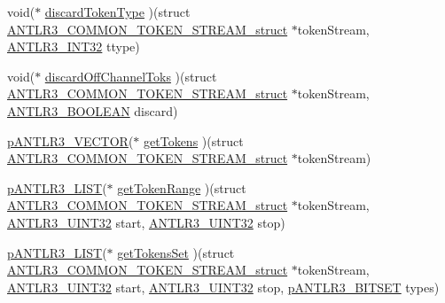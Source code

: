 \begin{DoxyCompactItemize}
\item 
void($\ast$ \hyperlink{struct_a_n_t_l_r3___c_o_m_m_o_n___t_o_k_e_n___s_t_r_e_a_m__struct_a9342253f1da5c79b615324f77c523d70}{discard\-Token\-Type} )(struct \hyperlink{struct_a_n_t_l_r3___c_o_m_m_o_n___t_o_k_e_n___s_t_r_e_a_m__struct}{A\-N\-T\-L\-R3\-\_\-\-C\-O\-M\-M\-O\-N\-\_\-\-T\-O\-K\-E\-N\-\_\-\-S\-T\-R\-E\-A\-M\-\_\-struct} $\ast$token\-Stream, \hyperlink{antlr3defs_8h_a6faef5c4687f8eb633d2aefea93973ca}{A\-N\-T\-L\-R3\-\_\-\-I\-N\-T32} ttype)
\item 
void($\ast$ \hyperlink{struct_a_n_t_l_r3___c_o_m_m_o_n___t_o_k_e_n___s_t_r_e_a_m__struct_aa851d1b2d1d1e28c84e988ac92972a30}{discard\-Off\-Channel\-Toks} )(struct \hyperlink{struct_a_n_t_l_r3___c_o_m_m_o_n___t_o_k_e_n___s_t_r_e_a_m__struct}{A\-N\-T\-L\-R3\-\_\-\-C\-O\-M\-M\-O\-N\-\_\-\-T\-O\-K\-E\-N\-\_\-\-S\-T\-R\-E\-A\-M\-\_\-struct} $\ast$token\-Stream, \hyperlink{antlr3defs_8h_a5b33dccbba3b7212539695e21df4079b}{A\-N\-T\-L\-R3\-\_\-\-B\-O\-O\-L\-E\-A\-N} discard)
\item 
\hyperlink{antlr3interfaces_8h_a0dfeeada7529fbe1b968be84079b828f}{p\-A\-N\-T\-L\-R3\-\_\-\-V\-E\-C\-T\-O\-R}($\ast$ \hyperlink{struct_a_n_t_l_r3___c_o_m_m_o_n___t_o_k_e_n___s_t_r_e_a_m__struct_a1ac2d1d9b3b9d3bb80cac9f70c9d2df4}{get\-Tokens} )(struct \hyperlink{struct_a_n_t_l_r3___c_o_m_m_o_n___t_o_k_e_n___s_t_r_e_a_m__struct}{A\-N\-T\-L\-R3\-\_\-\-C\-O\-M\-M\-O\-N\-\_\-\-T\-O\-K\-E\-N\-\_\-\-S\-T\-R\-E\-A\-M\-\_\-struct} $\ast$token\-Stream)
\item 
\hyperlink{antlr3interfaces_8h_ae2fcb7565c1f2a85d99e61299f33fbf1}{p\-A\-N\-T\-L\-R3\-\_\-\-L\-I\-S\-T}($\ast$ \hyperlink{struct_a_n_t_l_r3___c_o_m_m_o_n___t_o_k_e_n___s_t_r_e_a_m__struct_ab7edb18aa08d3a8826deca1cb976e31a}{get\-Token\-Range} )(struct \hyperlink{struct_a_n_t_l_r3___c_o_m_m_o_n___t_o_k_e_n___s_t_r_e_a_m__struct}{A\-N\-T\-L\-R3\-\_\-\-C\-O\-M\-M\-O\-N\-\_\-\-T\-O\-K\-E\-N\-\_\-\-S\-T\-R\-E\-A\-M\-\_\-struct} $\ast$token\-Stream, \hyperlink{antlr3defs_8h_ac41f744abd0fd25144b9eb9d11b1dfd1}{A\-N\-T\-L\-R3\-\_\-\-U\-I\-N\-T32} start, \hyperlink{antlr3defs_8h_ac41f744abd0fd25144b9eb9d11b1dfd1}{A\-N\-T\-L\-R3\-\_\-\-U\-I\-N\-T32} stop)
\item 
\hyperlink{antlr3interfaces_8h_ae2fcb7565c1f2a85d99e61299f33fbf1}{p\-A\-N\-T\-L\-R3\-\_\-\-L\-I\-S\-T}($\ast$ \hyperlink{struct_a_n_t_l_r3___c_o_m_m_o_n___t_o_k_e_n___s_t_r_e_a_m__struct_ad9165a26655f08efe2ebd812e59779e1}{get\-Tokens\-Set} )(struct \hyperlink{struct_a_n_t_l_r3___c_o_m_m_o_n___t_o_k_e_n___s_t_r_e_a_m__struct}{A\-N\-T\-L\-R3\-\_\-\-C\-O\-M\-M\-O\-N\-\_\-\-T\-O\-K\-E\-N\-\_\-\-S\-T\-R\-E\-A\-M\-\_\-struct} $\ast$token\-Stream, \hyperlink{antlr3defs_8h_ac41f744abd0fd25144b9eb9d11b1dfd1}{A\-N\-T\-L\-R3\-\_\-\-U\-I\-N\-T32} start, \hyperlink{antlr3defs_8h_ac41f744abd0fd25144b9eb9d11b1dfd1}{A\-N\-T\-L\-R3\-\_\-\-U\-I\-N\-T32} stop, \hyperlink{antlr3interfaces_8h_ab15ce244874643afe4a952daf417f744}{p\-A\-N\-T\-L\-R3\-\_\-\-B\-I\-T\-S\-E\-T} types)

\end{DoxyCompactItemize}
